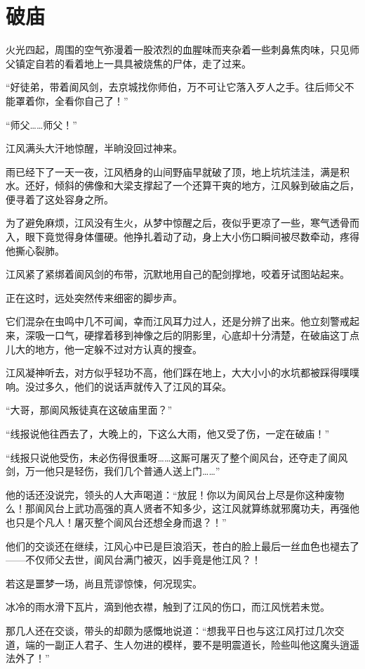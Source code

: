 \chapter{破庙}
火光四起，周围的空气弥漫着一股浓烈的血腥味而夹杂着一些刺鼻焦肉味，只见师父镇定自若的看着地上一具具被烧焦的尸体，走了过来。

“好徒弟，带着阆风剑，去京城找你师伯，万不可让它落入歹人之手。往后师父不能罩着你，全看你自己了！”

“师父……师父！”

江风满头大汗地惊醒，半晌没回过神来。

雨已经下了一天一夜，江风栖身的山间野庙早就破了顶，地上坑坑洼洼，满是积水。还好，倾斜的佛像和大梁支撑起了一个还算干爽的地方，江风躲到破庙之后，便寻着了这处容身之所。

为了避免麻烦，江风没有生火，从梦中惊醒之后，夜似乎更凉了一些，寒气透骨而入，眼下竟觉得身体僵硬。他挣扎着动了动，身上大小伤口瞬间被尽数牵动，疼得他撕心裂肺。

江风紧了紧绑着阆风剑的布带，沉默地用自己的配剑撑地，咬着牙试图站起来。

正在这时，远处突然传来细密的脚步声。

它们混杂在虫鸣中几不可闻，幸而江风耳力过人，还是分辨了出来。他立刻警戒起来，深吸一口气，硬撑着移到神像之后的阴影里，心底却十分清楚，在破庙这丁点儿大的地方，他一定躲不过对方认真的搜查。

江风凝神听去，对方似乎轻功不高，他们踩在地上，大大小小的水坑都被踩得噗噗响。没过多久，他们的说话声就传入了江风的耳朵。

“大哥，那阆风叛徒真在这破庙里面？”

“线报说他往西去了，大晚上的，下这么大雨，他又受了伤，一定在破庙！”

“线报只说他受伤，未必伤得很重呀……这厮可屠灭了整个阆风台，还夺走了阆风剑，万一他只是轻伤，我们几个普通人送上门……”

他的话还没说完，领头的人大声喝道：“放屁！你以为阆风台上尽是你这种废物么！那阆风台上武功高强的真人贤者不知多少，这江风就算练就邪魔功夫，再强他也只是个凡人！屠灭整个阆风台还想全身而退？！”

他们的交谈还在继续，江风心中已是巨浪滔天，苍白的脸上最后一丝血色也褪去了——不仅师父去世，阆风台满门被灭，凶手竟是他江风？！

若这是噩梦一场，尚且荒谬惊悚，何况现实。

冰冷的雨水滑下瓦片，滴到他衣襟，触到了江风的伤口，而江风恍若未觉。

那几人还在交谈，带头的却颇为感慨地说道：“想我平日也与这江风打过几次交道，端的一副正人君子、生人勿进的模样，要不是明震道长，险些叫他这魔头逍遥法外了！”

